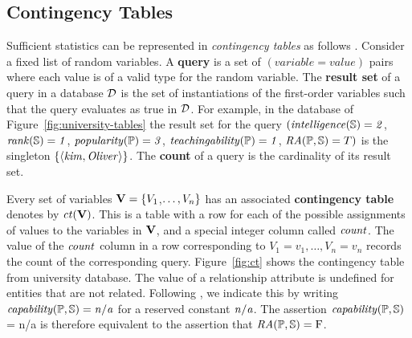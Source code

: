 \documentclass{vldb}
\newcommand{\ct}{\mathit{ct}}
\begin{document}
\subsection{Contingency Tables}
Sufficient statistics can be represented in {\em contingency tables} as follows \cite{Moore1998}. 
%
%
%
Consider a fixed list of  random variables.
A \textbf{query} is a set of $(variable = value)$ pairs where each value is of a valid type for the random variable. 
The \textbf{result set} of a query in a database $\D$ is the set of instantiations of the first-order variables such that the query evaluates as true in $\D$.
For example, in the database of Figure~\ref{fig:university-tables} the result set for the query 
$(\it{intelligence}(\S) = 2$, $\it{rank}(\S) = 1$, $\it{popularity}(\P) = 3$, $\it{teachingability}(\P) = 1$, $\ra(\P,\S) = T)$ is the singleton $\{\langle \it{kim}, \it{Oliver}\rangle\}$. 
The \textbf{count} of a query is the cardinality of its result set. 

Every set of variables $\set{V} = \{\V_{1}$,$\ldots,\V_{n} \}$ has an associated \textbf{contingency table} denotes by $\ct(\set{V})$. %
This is a table with a row for each of the possible assignments of values to the variables in $\set{V}$, and a special integer column called $\qcount$. 
The value of the $\qcount$ column in a row 
corresponding to $V_{1} = v_{1},\ldots,V_{n} = v_{n}$ records the count of the 
corresponding query. 
Figure~\ref{fig:ct} shows the contingency table from university database. 
The value of a relationship attribute is undefined for entities that are not related.
Following \cite{Milch2007}, %
we indicate this by writing 
$\it{capability(\P,\S)} = n/a $ for a reserved constant $\it{n/a}$. 
The assertion $\it{capability(\P,\S)}$ = n/a is therefore equivalent to the assertion that $\ra(\P,\S) = \false$.
\end{document}
